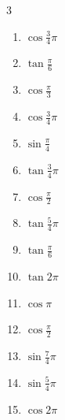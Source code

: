 \begin{multicols}{3}
\begin{enumerate}
  \item $\displaystyle \cos{\frac{3}{4}\pi}$

  \item $\displaystyle \tan{\frac{\pi}{6}}$

  \item $\displaystyle \cos{\frac{\pi}{3}}$

  \item $\displaystyle \cos{\frac{3}{4}\pi}$

  \item $\displaystyle \sin{\frac{\pi}{4}}$

  \item $\displaystyle \tan{\frac{3}{4}\pi}$
        \phantom{$\displaystyle =-1$}

  \item $\displaystyle \cos{\frac{\pi}{2}}$
        \phantom{$\displaystyle =0$}

  \item $\displaystyle \tan{\frac{5}{4}\pi}$
        \phantom{$\displaystyle =1$}

  \item $\displaystyle \tan{\frac{\pi}{6}}$

  \item $\displaystyle \tan{2\pi}$
        \phantom{$\displaystyle =0$}

  \item $\displaystyle \cos{\pi}$
        \phantom{$\displaystyle =-1$}

  \item $\displaystyle \cos{\frac{\pi}{2}}$
        \phantom{$\displaystyle =0$}

\columnbreak %

  \item $\displaystyle \sin{\frac{7}{4}\pi}$

  \item $\displaystyle \sin{\frac{5}{4}\pi}$

  \item $\displaystyle \cos{2\pi}$
        \phantom{$\displaystyle =1$}


\end{enumerate}
\end{multicols}
